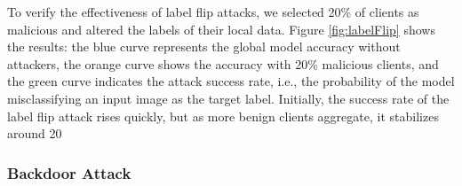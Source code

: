 \documentclass[conference]{IEEEtran}
\begin{document}
To verify the effectiveness of label flip attacks, we selected 20\% of clients as malicious and altered the labels of their local data. Figure \hyperref[fig:labelFlip]{\ref{fig:labelFlip}} shows the results: the blue curve represents the global model accuracy without attackers, the orange curve shows the accuracy with 20\% malicious clients, and the green curve indicates the attack success rate, i.e., the probability of the model misclassifying an input image as the target label. Initially, the success rate of the label flip attack rises quickly, but as more benign clients aggregate, it stabilizes around 20%

\subsubsection{\textbf{Backdoor Attack}}
\label{exp:attack:backdoor}


\end{document}
